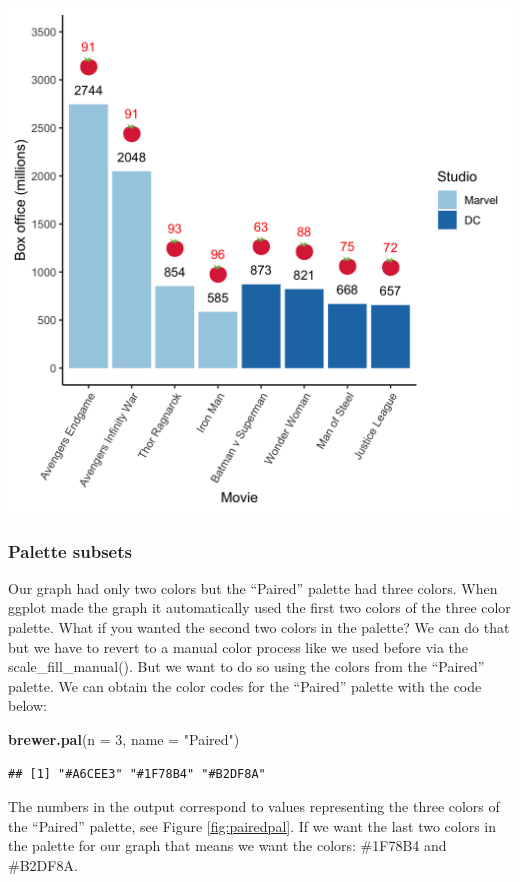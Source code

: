 \documentclass[
]{krantz}
\makeatletter
\newenvironment{Shaded}{\begin{snugshade}}{\end{snugshade}}
\newcommand{\DataTypeTok}[1]{\textcolor[rgb]{0.27,0.27,0.27}{#1}}
\newcommand{\DecValTok}[1]{\textcolor[rgb]{0.06,0.06,0.06}{#1}}
\newcommand{\KeywordTok}[1]{\textcolor[rgb]{0.27,0.27,0.27}{\textbf{#1}}}
\newcommand{\NormalTok}[1]{#1}
\newcommand{\StringTok}[1]{\textcolor[rgb]{0.5,0.5,0.5}{#1}}
\newenvironment{kframe}{%
\medskip{}
\setlength{\fboxsep}{.8em}
 \def\at@end@of@kframe{}%
 \ifinner\ifhmode%
  \def\at@end@of@kframe{\end{minipage}}%
  \begin{minipage}{\columnwidth}%
 \fi\fi%
 \def\FrameCommand##1{\hskip\@totalleftmargin \hskip-\fboxsep
 \colorbox{shadecolor}{##1}\hskip-\fboxsep
     \hskip-\linewidth \hskip-\@totalleftmargin \hskip\columnwidth}%
 \MakeFramed {\advance\hsize-\width
   \@totalleftmargin\z@ \linewidth\hsize
   \@setminipage}}%
 {\par\unskip\endMakeFramed%
 \at@end@of@kframe}
\renewenvironment{Shaded}{\begin{kframe}}{\end{kframe}}
\makeatother
\begin{document}
\includegraphics[width=0.65\linewidth]{ch_graphing/images/emoji_graph4}

\hypertarget{palette-subsets}{%
\subsubsection{Palette subsets}\label{palette-subsets}}

Our graph had only two colors but the ``Paired'' palette had three colors. When ggplot made the graph it automatically used the first two colors of the three color palette. What if you wanted the second two colors in the palette? We can do that but we have to revert to a manual color process like we used before via the scale\_fill\_manual(). But we want to do so using the colors from the ``Paired'' palette. We can obtain the color codes for the ``Paired'' palette with the code below:

\begin{Shaded}
\begin{Highlighting}[]
\KeywordTok{brewer.pal}\NormalTok{(}\DataTypeTok{n =} \DecValTok{3}\NormalTok{, }\DataTypeTok{name =} \StringTok{"Paired"}\NormalTok{)}
\end{Highlighting}
\end{Shaded}

\begin{verbatim}
## [1] "#A6CEE3" "#1F78B4" "#B2DF8A"
\end{verbatim}

The numbers in the output correspond to values representing the three colors of the ``Paired'' palette, see Figure \ref{fig:pairedpal}. If we want the last two colors in the palette for our graph that means we want the colors: \#1F78B4 and \#B2DF8A.
\end{document}
